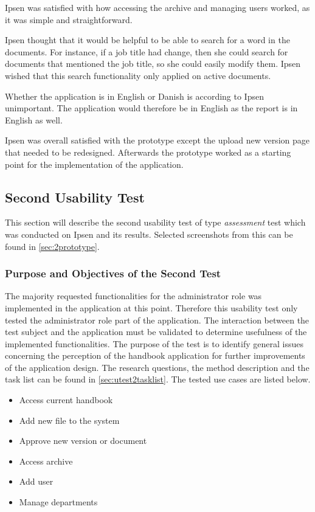 \documentclass[../../master.tex]{subfiles}
\begin{document}
Ipsen was satisfied with how accessing the archive and managing users worked, as it was simple and straightforward.

Ipsen thought that it would be helpful to be able to search for a word in the documents.
For instance, if a job title had change, then she could search for documents that mentioned the job title, so she could easily modify them.
Ipsen wished that this search functionality only applied on active documents.

Whether the application is in English or Danish is according to Ipsen unimportant.
The application would therefore be in English as the report is in English as well.

Ipsen was overall satisfied with the prototype except the upload new version page that needed to be redesigned.
Afterwards the prototype worked as a starting point for the implementation of the application.

\subsection{Second Usability Test}\label{secondtest}
This section will describe the second usability test of type \textit{assessment} test which was conducted on Ipsen and its results. Selected screenshots from this can be found in \cref{sec:2prototype}.

\subsubsection*{Purpose and Objectives of the Second Test}
The majority requested functionalities for the administrator role was implemented in the application at this point.
Therefore this usability test only tested the administrator role part of the application.
The interaction between the test subject and the application must be validated to determine usefulness of the implemented functionalities.
The purpose of the test is to identify general issues concerning the perception of the handbook application for further improvements of the application design.
The research questions, the method description and the task list can be found in \cref{sec:utest2tasklist}.
The tested use cases are listed below.

\begin{itemize}
	\item Access current handbook
	\item Add new file to the system
	\item Approve new version or document
	\item Access archive
	\item Add user
	\item Manage departments
\end{itemize}
\end{document}
